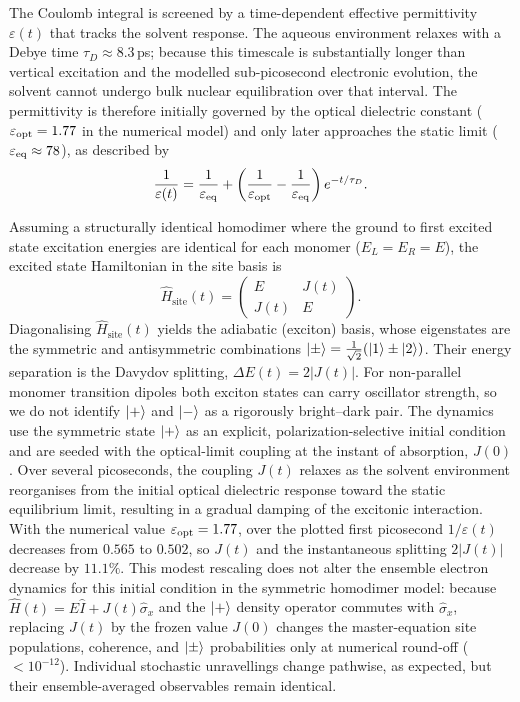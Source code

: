 \documentclass[journal=jpcbfk, manuscript=article, layout=twocolumn, doi=true]{achemso}
\begin{document}
The Coulomb integral is screened by a time-dependent effective permittivity $\varepsilon(t)$ that tracks the solvent response. The aqueous environment relaxes with a Debye time $\tau_D \approx 8.3$\,ps; because this timescale is substantially longer than vertical excitation and the modelled sub-picosecond electronic evolution, the solvent cannot undergo bulk nuclear equilibration over that interval. The permittivity is therefore initially governed by the optical dielectric constant ($\varepsilon_{\rm opt}=1.77$ in the numerical model) and only later approaches the static limit ($\varepsilon_{\rm eq} \approx 78$), as described by
\begin{equation}
    \frac{1}{\varepsilon(t)} = \frac{1}{\varepsilon_{\rm eq}} + \left(\frac{1}{\varepsilon_{\rm opt}} - \frac{1}{\varepsilon_{\rm eq}}\right)e^{-t/\tau_D}.
\end{equation}

Assuming a structurally identical homodimer where the ground to first excited state excitation energies are identical for each monomer ($E_L = E_R = E$), the excited state Hamiltonian in the site basis is
\begin{equation}
    \hat H_{\text{site}}(t)=\begin{pmatrix} E & J(t) \\ J(t) & E \end{pmatrix}.
\end{equation}
Diagonalising $\hat H_{\text{site}}(t)$ yields the adiabatic (exciton) basis, whose eigenstates are the symmetric and antisymmetric combinations $\ket{\pm} = \frac{1}{\sqrt{2}}(\ket{1} \pm \ket{2})$. Their energy separation is the Davydov splitting, $\Delta E(t) = 2|J(t)|$. For non-parallel monomer transition dipoles both exciton states can carry oscillator strength, so we do not identify $\ket{+}$ and $\ket{-}$ as a rigorously bright--dark pair. The dynamics use the symmetric state $\ket{+}$ as an explicit, polarization-selective initial condition and are seeded with the optical-limit coupling at the instant of absorption, $J(0)$. Over several picoseconds, the coupling $J(t)$ relaxes as the solvent environment reorganises from the initial optical dielectric response toward the static equilibrium limit, resulting in a gradual damping of the excitonic interaction. With the numerical value $\varepsilon_{\rm opt}=1.77$, over the plotted first picosecond $1/\varepsilon(t)$ decreases from $0.565$ to $0.502$, so $J(t)$ and the instantaneous splitting $2|J(t)|$ decrease by $11.1\%$. This modest rescaling does not alter the ensemble electron dynamics for this initial condition in the symmetric homodimer model: because $\hat H(t)=E\hat I+J(t)\hat\sigma_x$ and the $\ket{+}$ density operator commutes with $\hat\sigma_x$, replacing $J(t)$ by the frozen value $J(0)$ changes the master-equation site populations, coherence, and $\ket{\pm}$ probabilities only at numerical round-off ($<10^{-12}$). Individual stochastic unravellings change pathwise, as expected, but their ensemble-averaged observables remain identical.
\end{document}
